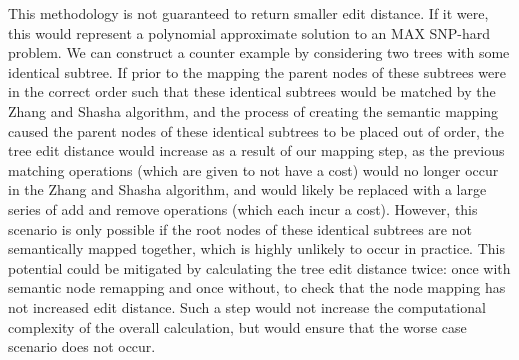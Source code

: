 This methodology is not guaranteed to return smaller edit distance. If it were, this would represent a polynomial approximate solution to an MAX SNP-hard problem. We can construct a counter example by considering two trees with some identical subtree. If prior to the mapping the parent nodes of these subtrees were in the correct order such that these identical subtrees would be matched by the Zhang and Shasha algorithm, and the process of creating the semantic mapping caused the parent nodes of these identical subtrees to be placed out of order, the tree edit distance would increase as a result of our mapping step, as the previous matching operations (which are given to not have a cost) would no longer occur in the Zhang and Shasha algorithm, and would likely be replaced with a large series of add and remove operations (which each incur a cost). However, this scenario is only possible if the root nodes of these identical subtrees are not semantically mapped together, which is highly unlikely to occur in practice. This potential could be mitigated by calculating the tree edit distance twice: once with semantic node remapping and once without, to check that the node mapping has not increased edit distance. Such a step would not increase the computational complexity of the overall calculation, but would ensure that the worse case scenario does not occur.





